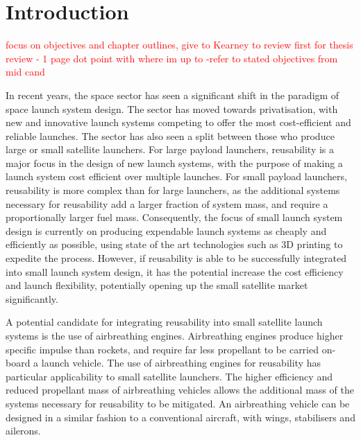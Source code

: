 
\cleardoublepage
\chapter{Introduction}
\textcolor{red}{
focus on objectives and chapter outlines,
give to Kearney to review first
for thesis review - 1 page dot point with where im up to
-refer to stated objectives from mid cand}	
  	
  	
  	In recent years, the space sector has seen a significant shift in the paradigm of space launch system design. 
  	The sector has moved towards privatisation, with new and innovative launch systems competing to offer the most cost-efficient and reliable launches. 
  	The sector has also seen a split between those who produce large or small satellite launchers. 
  	For large payload launchers, reusability is a major focus in the design of new launch systems, with the purpose of making a launch system cost efficient over multiple launches. 
  	For small payload launchers, reusability is more complex than for large launchers, as the additional systems necessary for reusability add a larger fraction of system mass, and require a proportionally larger fuel mass. 
  	Consequently, the focus of small launch system design is currently on producing expendable launch systems as cheaply and efficiently as possible, using state of the art technologies such as 3D printing to expedite the process.
  	However, if reusability is able to be successfully integrated into small launch system design, it has the potential increase the cost efficiency and launch flexibility, potentially opening up the small satellite market significantly. 
  	
  	
  	
  	A potential candidate for integrating reusability into small satellite launch systems is the use of airbreathing engines.
Airbreathing engines produce higher specific impulse than rockets, and require far less propellant to be carried on-board a launch vehicle.  
 	The use of airbreathing engines for reusability has particular applicability to small satellite launchers. 	 
  	The higher efficiency and reduced propellant mass of airbreathing vehicles allows the additional mass of the systems necessary for reusability to be mitigated. An airbreathing vehicle can be designed in a similar fashion to a conventional aircraft, with wings, stabilisers and ailerons.
  	
